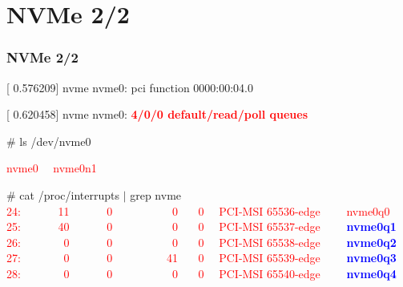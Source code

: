 \documentclass[aspectratio=169]{beamer}
\begin{document}
\section{NVMe 2/2}
\begin{frame}
\frametitle{NVMe 2/2}
\begin{block}{}
[    0.576209] nvme nvme0: pci function 0000:00:04.0

[    0.620458] nvme nvme0: \textbf{\textcolor{red}{4/0/0 default/read/poll queues}}
\end{block}
\begin{block}{}
\# ls /dev/nvme0

\textcolor{red}{nvme0 \ \ nvme0n1}
\end{block}
\begin{block}{}
\# cat /proc/interrupts $|$ grep nvme \\
\textcolor{red}{ 24: \ \ \ \ \ \ 11 \ \ \ \ \ \ 0 \ \ \ \ \ \ \ \ \ \ 0 \ \ \ 0 \ \ PCI-MSI 65536-edge \ \ \ \ nvme0q0} \\
\textcolor{red}{ 25: \ \ \ \ \ \ 40 \ \ \ \ \ \ 0 \ \ \ \ \ \ \ \ \ \ 0 \ \ \ 0 \ \ PCI-MSI 65537-edge \ \ \ \ \textbf{\textcolor{blue}{nvme0q1}}} \\
\textcolor{red}{ 26: \ \ \ \ \ \ \ 0 \ \ \ \ \ \ 0 \ \ \ \ \ \ \ \ \ \ 0 \ \ \ 0 \ \ PCI-MSI 65538-edge \ \ \ \ \textbf{\textcolor{blue}{nvme0q2}}} \\
\textcolor{red}{ 27: \ \ \ \ \ \ \ 0 \ \ \ \ \ \ 0 \ \ \ \ \ \ \ \ \ 41 \ \ \ 0 \ \ PCI-MSI 65539-edge \ \ \ \ \textbf{\textcolor{blue}{nvme0q3}}} \\
\textcolor{red}{ 28: \ \ \ \ \ \ \ 0 \ \ \ \ \ \ 0 \ \ \ \ \ \ \ \ \ \ 0 \ \ \ 0 \ \ PCI-MSI 65540-edge \ \ \ \ \textbf{\textcolor{blue}{nvme0q4}}}
\end{block}
\end{frame}

\end{document}
